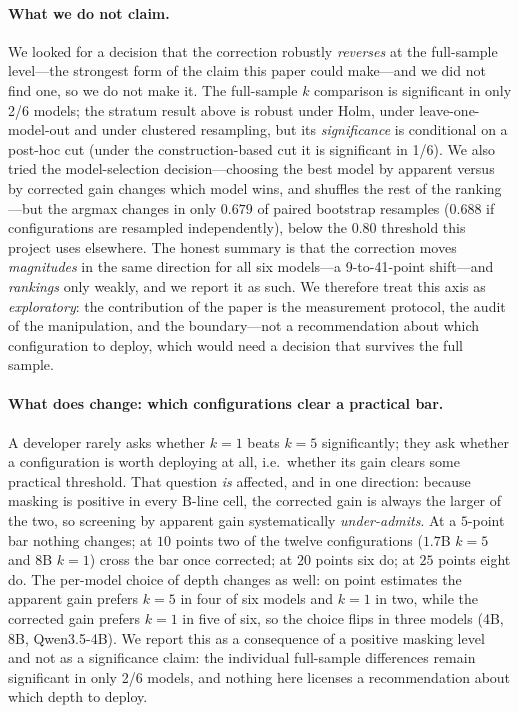 \documentclass[11pt]{article}
\begin{document}
\paragraph{What we do not claim.} We looked for a decision that the correction robustly
\emph{reverses} at the full-sample level---the strongest form of the claim this paper could
make---and we did not find one, so we do not make it. The full-sample $k$ comparison is
significant in only 2/6 models; the stratum result above is robust under Holm, under
leave-one-model-out and under clustered resampling, but its \emph{significance} is
conditional on a post-hoc cut (under the construction-based cut it is significant in 1/6).
We also tried the model-selection decision---choosing the best model by apparent versus by
corrected gain changes which model wins, and shuffles the rest of the ranking---but the
argmax changes in only $0.679$ of paired bootstrap resamples ($0.688$ if configurations are
resampled independently), below the $0.80$ threshold
this project uses elsewhere. The honest summary is that the correction moves
\emph{magnitudes} in the same direction for all six models---a 9-to-41-point shift---and
\emph{rankings} only weakly, and we report it as such. We therefore treat this axis as
\emph{exploratory}: the contribution of the paper is the measurement protocol, the audit of
the manipulation, and the boundary---not a recommendation about which configuration to
deploy, which would need a decision that survives the full sample.

\paragraph{What does change: which configurations clear a practical bar.} A developer rarely
asks whether $k{=}1$ beats $k{=}5$ significantly; they ask whether a configuration is worth
deploying at all, i.e.\ whether its gain clears some practical threshold. That question
\emph{is} affected, and in one direction: because masking is positive in every B-line cell,
the corrected gain is always the larger of the two, so screening by apparent gain
systematically \emph{under-admits}. At a $5$-point bar nothing changes; at $10$ points two of
the twelve configurations ($1.7$B $k{=}5$ and 8B $k{=}1$) cross the bar once corrected; at
$20$ points six do; at $25$ points eight do. The per-model choice of depth changes as well:
on point estimates the apparent gain prefers $k{=}5$ in four of six models and $k{=}1$ in
two, while the corrected gain prefers $k{=}1$ in five of six, so the choice flips in three
models (4B, 8B, Qwen3.5-4B). We report this as a consequence of a positive masking level and
not as a significance claim: the individual full-sample differences remain significant in
only 2/6 models, and nothing here licenses a recommendation about which depth to deploy.
\end{document}
